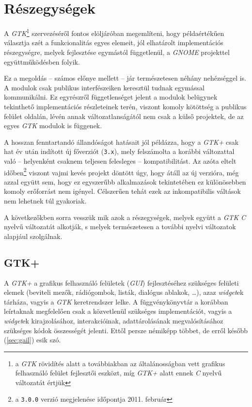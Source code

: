 \section{Részegységek}

A \textit{GTK}\footnote{a \textit{GTK} rövidítés alatt a továbbiakban az általánosságban vett grafikus felhasználó felület fejlesztői eszközt, míg \textit{GTK+} alatt ennek \textit{C} nyelvű változatát értjük} szervezéséről fontos elöljáróban megemlíteni, hogy példaértékűen választja szét a funkcionalitás egyes elemeit, jól elhatárolt implementációs részegységre, melyek fejlesztése egymástól függetlenül, a \textit{GNOME} projekttel együttműködésben folyik.

Ez a megoldás -- számos előnye mellett -- jár természetesen néhány nehézséggel is. A modulok csak publikus interfészeiken keresztül tudnak egymással kommunikálni. Ez egyrészről függetlenséget jelent a modulok belügynek tekinthető implementációs részleteinek terén, viszont komoly kötöttség a publikus felület oldalán, lévén annak változatlanságától nem csak a külső projektek, de az egyes \textit{GTK} modulok is függenek.

A hosszan fenntartandó állandóságot hatásait jól példázza, hogy a \textit{GTK+} csak hat év után indított új főverziót (\texttt{3.x}), mely felszámolta a korábbi változattal való -- helyenként csaknem teljesen felesleges -- kompatibilitást. Az azóta eltelt időben\footnote{a \texttt{3.0.0} verzió megjelenése időpontja 2011. február} viszont vajmi kevés projekt döntött úgy, hogy átáll az új verzióra, még azzal együtt sem, hogy ez egyszerűbb alkalmazások tekintetében ez különösebben komoly erőforrást nem igényel. Célszerűen tehát ezek az inkompatibilis váltások nem lehetnek túl gyakoriak.

A következőkben sorra vesszük mik azok a részegységek, melyek együtt a \textit{GTK} \textit{C} nyelvű változatát alkotják, s melyek természetesen a további nyelvi változatok alapjául szolgálnak.

\subsection{GTK+}

A \textit{GTK+} a grafikus felhasználó felületek (\textit{GUI}) fejlesztéséhez szükséges felületi elemek (beviteli mezők, rádiógombok, listák, dialógus ablakok, \dots), azaz \textit{widget}ek tárháza, vagyis a \textit{GTK} keretrendszer lelke. A függvénykönyvtár a korábban leírtaknak megfelelően csak a közvetlenül szükséges implementációt, vagyis a \textit{widget}ek kirajzolásához, interakcióinak, adattárolásának megvalósításához szükséges kódok összességét jelenti. Ettől persze némiképp többet, de erről később (\ref{sec:gail}) esik szó.

